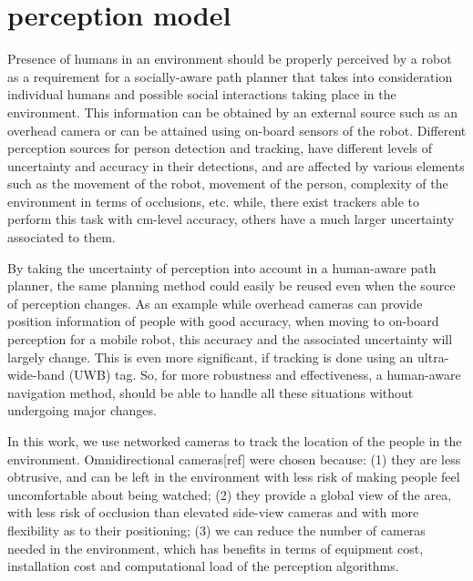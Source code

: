 \section{perception model}
\label{sec: perception model}


Presence of humans in an environment should be properly perceived by a robot as a requirement for a socially-aware path planner that takes into consideration individual humans and possible social interactions taking place in the environment. This information can be obtained by an external source such as an overhead camera or can be attained using on-board sensors of the robot. Different perception sources for person detection and tracking, have different levels of uncertainty and accuracy in their detections, and are affected by various elements such as the movement of the robot, movement of the person, complexity of the environment in terms of occlusions, etc. while, there exist trackers able to perform this task with cm-level accuracy, others have a much larger uncertainty associated to them. 

By taking the uncertainty of perception into account in a human-aware path planner, the same planning method could easily be reused even when the source of perception changes. As an example while overhead cameras can provide position information of people with good accuracy, when moving to on-board perception for a mobile robot, this accuracy and the associated uncertainty will largely change. This is even more significant, if tracking is done using an ultra-wide-band (UWB) tag. So, for more robustness and effectiveness, a human-aware navigation method, should be able to handle all these situations without undergoing major changes.



In this work, we use networked cameras to track the location of the people in the environment. Omnidirectional cameras[ref] were chosen because: (1) they are less obtrusive, and can be left in the environment with less risk
of making people feel uncomfortable about being watched; (2) they provide a global view of the area, with less risk of occlusion than elevated side-view cameras and with more flexibility as to their positioning; (3) we can reduce the number of cameras needed in the environment, which has benefits
in terms of equipment cost, installation cost and computational load of the perception algorithms.

